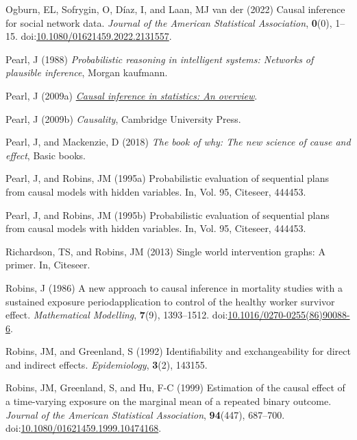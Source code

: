 \documentclass[
  singlecolumn,
  9pt]{article}
\begin{document}
\begin{CSLReferences}
Ogburn, EL, Sofrygin, O, Díaz, I, and Laan, MJ van der (2022) Causal
inference for social network data. \emph{Journal of the American
Statistical Association}, \textbf{0}(0), 1--15.
doi:\href{https://doi.org/10.1080/01621459.2022.2131557}{10.1080/01621459.2022.2131557}.

Pearl, J (1988) \emph{Probabilistic reasoning in intelligent systems:
Networks of plausible inference}, Morgan kaufmann.

Pearl, J (2009a) \emph{\href{https://doi.org/10.1214/09-SS057}{Causal
inference in statistics: An overview}}.

Pearl, J (2009b) \emph{Causality}, Cambridge University Press.

Pearl, J, and Mackenzie, D (2018) \emph{The book of why: The new science
of cause and effect}, Basic books.

Pearl, J, and Robins, JM (1995a) Probabilistic evaluation of sequential
plans from causal models with hidden variables. In, Vol. 95, Citeseer,
444453.

Pearl, J, and Robins, JM (1995b) Probabilistic evaluation of sequential
plans from causal models with hidden variables. In, Vol. 95, Citeseer,
444453.

Richardson, TS, and Robins, JM (2013) Single world intervention graphs:
A primer. In, Citeseer.

Robins, J (1986) A new approach to causal inference in mortality studies
with a sustained exposure period{\textemdash}application to control of
the healthy worker survivor effect. \emph{Mathematical Modelling},
\textbf{7}(9), 1393--1512.
doi:\href{https://doi.org/10.1016/0270-0255(86)90088-6}{10.1016/0270-0255(86)90088-6}.

Robins, JM, and Greenland, S (1992) Identifiability and exchangeability
for direct and indirect effects. \emph{Epidemiology}, \textbf{3}(2),
143155.

Robins, JM, Greenland, S, and Hu, F-C (1999) Estimation of the causal
effect of a time-varying exposure on the marginal mean of a repeated
binary outcome. \emph{Journal of the American Statistical Association},
\textbf{94}(447), 687--700.
doi:\href{https://doi.org/10.1080/01621459.1999.10474168}{10.1080/01621459.1999.10474168}.


\end{CSLReferences}
\end{document}
